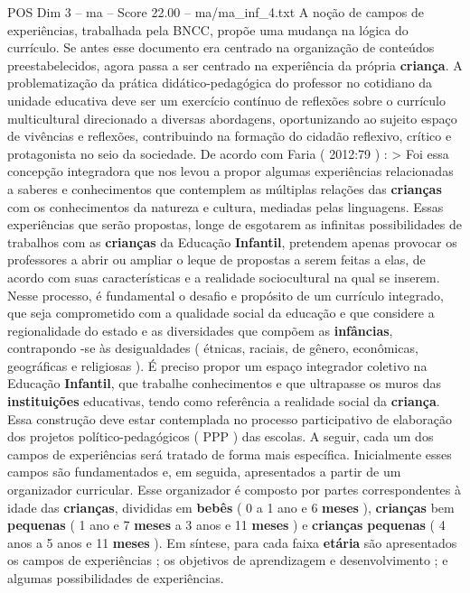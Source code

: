 \begin{textsample}{POS Dim 3 – ma – Score 22.00 – ma/ma\_inf\_4.txt}
A noção de campos de experiências, trabalhada pela BNCC, propõe uma mudança na lógica do currículo.
Se antes esse documento era centrado na organização de conteúdos preestabelecidos, agora passa a ser centrado na experiência da própria \textbf{criança}.
A problematização da prática didático-pedagógica do professor no cotidiano da unidade educativa deve ser um exercício contínuo de reflexões sobre o currículo multicultural direcionado a diversas abordagens, oportunizando ao sujeito espaço de vivências e reflexões, contribuindo na formação do cidadão reflexivo, crítico e protagonista no seio da sociedade.
De acordo com Faria ( 2012:79 ) : > Foi essa concepção integradora que nos levou a propor algumas experiências relacionadas a saberes e conhecimentos que contemplem as múltiplas relações das \textbf{crianças} com os conhecimentos da natureza e cultura, mediadas pelas linguagens.
Essas experiências que serão propostas, longe de esgotarem as infinitas possibilidades de trabalhos com as \textbf{crianças} da Educação \textbf{Infantil}, pretendem apenas provocar os professores a abrir ou ampliar o leque de propostas a serem feitas a elas, de acordo com suas características e a realidade sociocultural na qual se inserem.
Nesse processo, é fundamental o desafio e propósito de um currículo integrado, que seja comprometido com a qualidade social da educação e que considere a regionalidade do estado e as diversidades que compõem as \textbf{infâncias}, contrapondo -se às desigualdades ( étnicas, raciais, de gênero, econômicas, geográficas e religiosas ).
É preciso propor um espaço integrador coletivo na Educação \textbf{Infantil}, que trabalhe conhecimentos e que ultrapasse os muros das \textbf{instituições} educativas, tendo como referência a realidade social da \textbf{criança}.
Essa construção deve estar contemplada no processo participativo de elaboração dos projetos político-pedagógicos ( PPP ) das escolas.
A seguir, cada um dos campos de experiências será tratado de forma mais específica.
Inicialmente esses campos são fundamentados e, em seguida, apresentados a partir de um organizador curricular.
Esse organizador é composto por partes correspondentes à idade das \textbf{crianças}, divididas em \textbf{bebês} ( 0 a 1 ano e 6 \textbf{meses} ), \textbf{crianças} bem \textbf{pequenas} ( 1 ano e 7 \textbf{meses} a 3 anos e 11 \textbf{meses} ) e \textbf{crianças} \textbf{pequenas} ( 4 anos a 5 anos e 11 \textbf{meses} ).
Em síntese, para cada faixa \textbf{etária} são apresentados os campos de experiências ; os objetivos de aprendizagem e desenvolvimento ; e algumas possibilidades de experiências.

\end{textsample}
